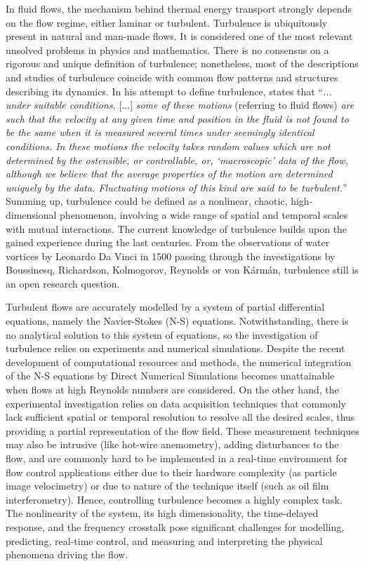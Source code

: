 In fluid flows, the mechanism behind thermal energy transport strongly depends on the flow regime, either laminar or turbulent. Turbulence is ubiquitously present in natural and man-made flows. It is considered one of the most relevant unsolved problems in physics and mathematics. There is no consensus on a rigorous and unique definition of turbulence; nonetheless, most of the descriptions and studies of turbulence coincide with common flow patterns and structures describing its dynamics. In his attempt to define turbulence, \citet{batchelor1953theory} states that
%
   ``\textit{... under suitable conditions,} [...] \textit{some of these motions} (referring to fluid flows) \textit{are such that the velocity at any given time and position in the fluid is not found to be the same when it is measured several times under seemingly identical conditions. In these motions the velocity takes random values which are not determined by the ostensible, or controllable, or, `macroscopic' data of the flow, although we believe that the average properties of the motion are determined uniquely by the data. Fluctuating motions of this kind are said to be turbulent.}''
%
Summing up, turbulence could be defined as a nonlinear, chaotic, high-dimensional phenomenon, involving a wide range of spatial and temporal scales with mutual interactions. The current knowledge of turbulence \citep[see e.g.][]{pope2000} builds upon the gained experience during the last centuries. From the observations of water vortices by Leonardo Da Vinci in 1500 passing through the investigations by Boussinesq, Richardson, Kolmogorov, Reynolds or von Kármán, turbulence still is an open research question.

Turbulent flows are accurately modelled by a system of partial differential equations, namely the Navier-Stokes (N-S) equations. Notwithstanding, there is no analytical solution to this system of equations, so the investigation of turbulence relies on experiments and numerical simulations. Despite the recent development of computational resources and methods, the numerical integration of the N-S equations by Direct Numerical Simulations \citep[DNS,][]{Moin1998DNS} becomes unattainable when flows at high Reynolds numbers are considered. On the other hand, the experimental investigation relies on data acquisition techniques that commonly lack sufficient spatial or temporal resolution to resolve all the desired scales, thus providing a partial representation of the flow field. These measurement techniques may also be intrusive (like hot-wire anemometry), adding disturbances to the flow, and are commonly hard to be implemented in a real-time environment for flow control applications either due to their hardware complexity (as particle image velocimetry) or due to nature of the technique itself (such as oil film interferometry). Hence, controlling turbulence becomes a highly complex task. The nonlinearity of the system, its high dimensionality, the time-delayed response, and the frequency crosstalk pose significant challenges for modelling, predicting, real-time control, and measuring and interpreting the physical phenomena driving the flow. 


